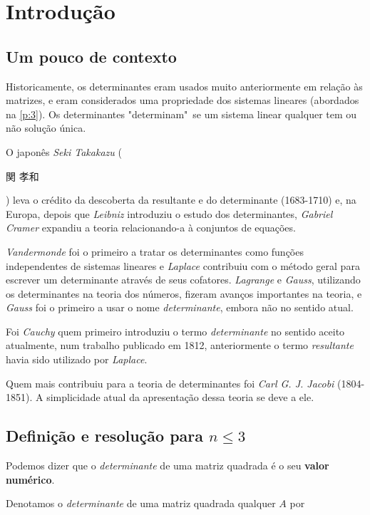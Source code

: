 \chapter{Introdução}

\section{Um pouco de contexto}

Historicamente, os determinantes eram usados muito anteriormente em relação às matrizes, e eram considerados uma propriedade dos sistemas lineares (abordados na \autoref{p:3}). Os determinantes "determinam"~se um sistema linear qualquer tem ou não solução única.

O japonês \textit{Seki Takakazu} (\begin{CJK}{UTF8}{min}関 孝和\end{CJK}) leva o crédito da descoberta da resultante e do determinante (1683-1710) e, na Europa, depois que \textit{Leibniz} introduziu o estudo dos determinantes, \textit{Gabriel Cramer} expandiu a teoria relacionando-a à conjuntos de equações.

\textit{Vandermonde} foi o primeiro a tratar os determinantes como funções independentes de sistemas lineares e \textit{Laplace} contribuiu com o método geral para escrever um determinante através de seus cofatores. \textit{Lagrange} e \textit{Gauss}, utilizando os determinantes na teoria dos números, fizeram avanços importantes na teoria, e \textit{Gauss} foi o primeiro a usar o nome \textit{determinante}, embora não no sentido atual.

Foi \textit{Cauchy} quem primeiro introduziu o termo \textit{determinante} no sentido aceito atualmente, num trabalho publicado em 1812, anteriormente o termo \textit{resultante} havia sido utilizado por \textit{Laplace}.

Quem mais contribuiu para a teoria de determinantes foi \textit{Carl G. J. Jacobi} (1804-1851). A simplicidade atual da apresentação dessa teoria se deve a ele.


\section{Definição e resolução para \texorpdfstring{$n \leqslant 3$}{n <= 3}}

Podemos dizer que o \textit{determinante} de uma matriz quadrada é o seu \textbf{valor numérico}.

Denotamos o \textit{determinante} de uma matriz quadrada qualquer $A$ por

